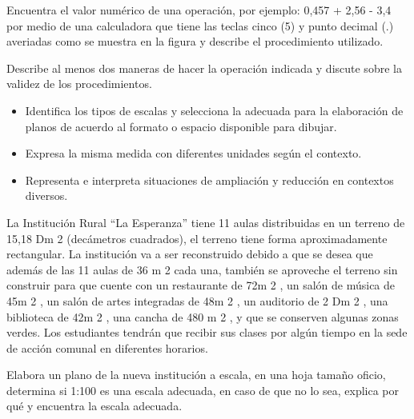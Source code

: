 \ejemplo

Encuentra el valor numérico de una operación, por ejemplo: 0,457 + 2,56 - 3,4 por medio de una calculadora que tiene las teclas cinco (5) y punto decimal (.) averiadas como se muestra en la figura y describe el procedimiento utilizado.


Describe al menos dos maneras de hacer la operación indicada y discute sobre la validez de los procedimientos.



\evidencias

\begin{itemize}
  \item Identifica los tipos de escalas y selecciona la adecuada para la elaboración de planos de acuerdo al formato o espacio disponible para dibujar.
  \item Expresa la misma medida con diferentes unidades según el contexto.
  \item Representa e interpreta situaciones de ampliación y reducción en contextos diversos.
\end{itemize}

\ejemplo

La Institución Rural “La Esperanza” tiene 11 aulas distribuidas en un terreno de 15,18 Dm 2 (decámetros cuadrados), el terreno tiene forma aproximadamente rectangular. La institución va a ser reconstruido debido a que se desea que además de las 11 aulas de 36 m 2 cada una, también se aproveche el terreno sin construir para que cuente con un restaurante de 72m 2 , un salón de música de 45m 2 , un salón de artes integradas de 48m 2 , un auditorio de 2 Dm 2 , una biblioteca de 42m 2 , una cancha de 480 m 2 , y que se conserven algunas zonas verdes. Los estudiantes tendrán que recibir sus clases por algún tiempo en la sede de acción comunal en diferentes horarios.

Elabora un plano de la nueva institución a escala, en una hoja tamaño oficio, determina si 1:100 es una escala adecuada, en caso de que no lo sea, explica por qué y encuentra la escala adecuada.




